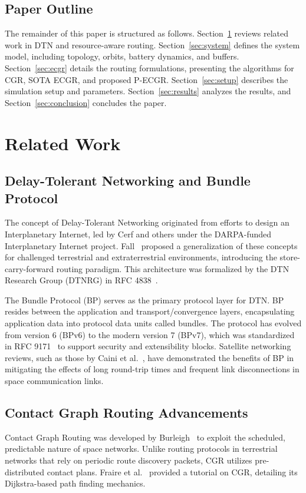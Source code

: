 \documentclass[journal,twocolumn]{IEEEtran}
\newcommand{\ecgr}{\textsf{ECGR}}
\newcommand{\pecgr}{\textsf{P-ECGR}}
\begin{document}
\subsection{Paper Outline}
The remainder of this paper is structured as follows. Section~\ref{sec:related} reviews related work in DTN and resource-aware routing. Section~\ref{sec:system} defines the system model, including topology, orbits, battery dynamics, and buffers. Section~\ref{sec:ecgr} details the routing formulations, presenting the algorithms for CGR, SOTA \ecgr{}, and proposed \pecgr{}. Section~\ref{sec:setup} describes the simulation setup and parameters. Section~\ref{sec:results} analyzes the results, and Section~\ref{sec:conclusion} concludes the paper.

\section{Related Work}
\label{sec:related}

\subsection{Delay-Tolerant Networking and Bundle Protocol}
The concept of Delay-Tolerant Networking originated from efforts to design an Interplanetary Internet, led by Cerf and others under the DARPA-funded Interplanetary Internet project. Fall~\cite{fall2003dtn} proposed a generalization of these concepts for challenged terrestrial and extraterrestrial environments, introducing the store-carry-forward routing paradigm. This architecture was formalized by the DTN Research Group (DTNRG) in RFC 4838~\cite{cerf2007dtn}. 

The Bundle Protocol (BP) serves as the primary protocol layer for DTN. BP resides between the application and transport/convergence layers, encapsulating application data into protocol data units called bundles. The protocol has evolved from version 6 (BPv6) to the modern version 7 (BPv7), which was standardized in RFC 9171~\cite{rfc9171} to support security and extensibility blocks. Satellite networking reviews, such as those by Caini et al.~\cite{caini2011dtn}, have demonstrated the benefits of BP in mitigating the effects of long round-trip times and frequent link disconnections in space communication links.

\subsection{Contact Graph Routing Advancements}
Contact Graph Routing was developed by Burleigh~\cite{burleigh2010cgr} to exploit the scheduled, predictable nature of space networks. Unlike routing protocols in terrestrial networks that rely on periodic route discovery packets, CGR utilizes pre-distributed contact plans. Fraire et al.~\cite{fraire2021cgr} provided a tutorial on CGR, detailing its Dijkstra-based path finding mechanics. 
\end{document}
